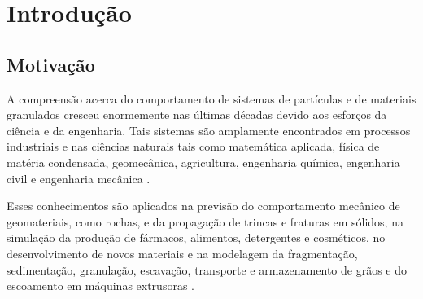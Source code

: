 \chapter[Introdução]{Introdução}

\section{Motivação} \label{sec:motivation}

A compreensão acerca do comportamento de sistemas de partículas e de materiais granulados cresceu enormemente nas últimas décadas devido aos esforços da ciência e da engenharia. Tais sistemas são amplamente encontrados em processos industriais e nas ciências naturais \cite{bib:computational_granular_dynamics} tais como matemática aplicada, física de matéria condensada, geomecânica, agricultura, engenharia química, engenharia civil e engenharia mecânica \cite{bib:rolling}.

Esses conhecimentos são aplicados na previsão do comportamento mecânico de geomateriais, como rochas, e da propagação de trincas e fraturas em sólidos, na simulação da produção de fármacos, alimentos, detergentes e cosméticos, no desenvolvimento de novos materiais e na modelagem da fragmentação, sedimentação, granulação, escavação, transporte e armazenamento de grãos e do escoamento em máquinas extrusoras \cite{bib:donze,bib:poschel,bib:applications}.

		

